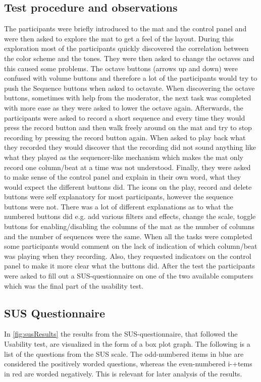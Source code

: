 \subsection{Test procedure and observations}

The participants were briefly introduced to the mat and the control panel and were then asked to explore the mat to get a feel of the layout. During this exploration most of the participants quickly discovered the correlation between the color scheme and the tones. They were then asked to change the octaves and this caused some problems. The octave buttons (arrows up and down) were confused with volume buttons and therefore a lot of the participants would try to push the Sequence buttons when asked to octavate. When discovering the octave buttons, sometimes with help from the moderator, the next task was completed with more ease as they were asked to lower the octave again. Afterwards, the participants were asked to record a short sequence and every time they would press the record button and then walk freely around on the mat and try to stop recording by pressing the record button again. When asked to play back what they recorded they would discover that the recording did not sound anything like what they played as the sequencer-like mechanism which makes the mat only record one column/beat at a time was not understood. Finally, they were asked to make sense of the control panel and explain in their own word, what they would expect the different buttons did. The icons on the play, record and delete buttons were self explanatory for most participants, however the sequence buttons were not. There was a lot of different explanations as to what the numbered buttons did e.g. add various filters and effects, change the scale, toggle buttons for enabling/disabling the columns of the mat as the number of columns and the number of sequences were the same. When all the tasks were completed some participants would comment on the lack of indication of which column/beat was playing when they recording. Also, they requested indicators on the control panel to make it more clear what the buttons did. After the test the participants were asked to fill out a SUS-questionnaire on one of the two available computers which was the final part of the usability test.

\subsection{SUS Questionnaire}
In \autoref{fig:susResults} the results from the SUS-questionnaire, that followed the Usability test, are visualized in the form of a box plot graph. The following is a list of the questions from the SUS scale. The odd-numbered items in blue are considered the positively worded questions, whereas the even-numbered i-+tems in red are worded negatively. This is relevant for later analysis of the results.\\

